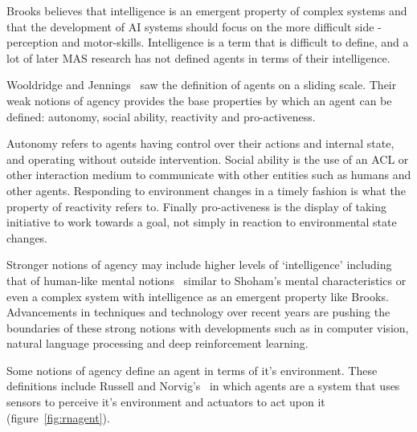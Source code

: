 \documentclass[]{final_report}
\begin{document}
Brooks believes that intelligence is an emergent property of complex systems and that the development of AI systems should focus on the more difficult side - perception and motor-skills. Intelligence is a term that is difficult to define, and a lot of later MAS research has not defined agents in terms of their intelligence.\par Wooldridge and Jennings~\cite{wooldridge_jennings_1995} saw the definition of agents on a sliding scale. Their weak notions of agency provides the base properties by which an agent can be defined: autonomy, social ability, reactivity and pro-activeness.\par 
Autonomy refers to agents having control over their actions and internal state, and operating without outside intervention. Social ability is the use of an ACL or other interaction medium to communicate with other entities such as humans and other agents. Responding to environment changes in a timely fashion is what the property of reactivity refers to. Finally pro-activeness is the display of taking initiative to work towards a goal, not simply in reaction to environmental state changes.\par 
Stronger notions of agency may include higher levels of `intelligence' including that of human-like mental notions~\cite{wooldridge_jennings_1995} similar to Shoham's mental characteristics or even a complex system with intelligence as an emergent property like Brooks. Advancements in techniques and technology over recent years are pushing the boundaries of these strong notions with developments such as in computer vision, natural language processing and deep reinforcement learning.\par 
Some notions of agency define an agent in terms of it's environment. These definitions include Russell and Norvig's~\cite{russell2016artificial} in which agents are a system that uses sensors to perceive it's environment and actuators to act upon it (figure~\ref{fig:rnagent}).
\end{document}
